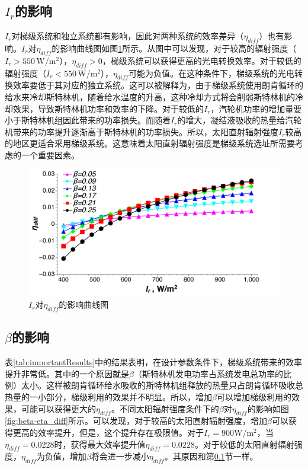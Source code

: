 \subsection{$I_{r}$的影响}
\label{sec:I_r}

$I_r$对梯级系统和独立系统都有影响，因此对两种系统的效率差异（$\eta_{diff}$）也有影响。$I_r$对$\eta_{diff}$的影响曲线图如图\ref{fig:I_r-eta_diff}所示。从图中可以发现，对于较高的辐射强度（$I_r > 550\,\mathrm{W/m^2}$），$\eta_{diff}>0$，梯级系统可以获得更高的光电转换效率。对于较低的辐射强度（$I_r < 550\,$W/m$^2$），$\eta_{diff}$可能为负值。在这种条件下，梯级系统的光电转换效率要低于其对应的独立系统。这可以被解释为，由于梯级系统使用朗肯循环的给水来冷却斯特林机，随着给水温度的升高，这种冷却方式将会削弱斯特林机的冷却效果，导致斯特林机功率和效率的下降。对于较低的$I_r$，汽轮机功率的增加量要小于斯特林机组因此带来的功率损失。而随着$I_r$的增大，凝结液吸收的热量给汽轮机带来的功率提升逐渐高于斯特林机的功率损失。所以，太阳直射辐射强度$I_r$较高的地区更适合采用梯级系统。这意味着太阳直射辐射强度是梯级系统选址所需要考虑的一个重要因素。


\noindent \begin{figure}[htbp]
\begin{center}
	\includegraphics[width = 0.8\columnwidth, angle = 0]{fig/I_r-eta_diff}
	\caption{$I_r$对$\eta_{diff}$的影响曲线图}
	\label{fig:I_r-eta_diff}
\end{center}
\end{figure}

\subsection{$\beta$的影响}

表\ref{tab:importantResults}中的结果表明，在设计参数条件下，梯级系统带来的效率提升非常低。其中的一个原因就是$\beta$（斯特林机发电功率占系统发电总功率的比例）太小。这样被朗肯循环给水吸收的斯特林机组释放的热量只占朗肯循环吸收总热量的一小部分，梯级利用的效果并不明显。所以，增加$\beta$可以增加梯级利用的效果，可能可以获得更大的$\eta_{diff}$。不同太阳辐射强度条件下的$\beta$对$\eta_{diff}$的影响如图\ref{fig:beta-eta_diff}所示。可以发现，对于较高的太阳直射辐射强度，增加$\beta$可以获得更高的效率提升，但是，这个提升存在极限值。对于$I_r=900$W/m$^2$，当$\eta_{diff}=0.0228$时，获得最大效率提升值$\eta_{diff}=0.0228$。对于较低的太阳直射辐射强度，$\eta_{diff}$为负值，增加$\beta$将会进一步减小$\eta_{diff}$。其原因和第\ref{sec:I_r}节一样。


